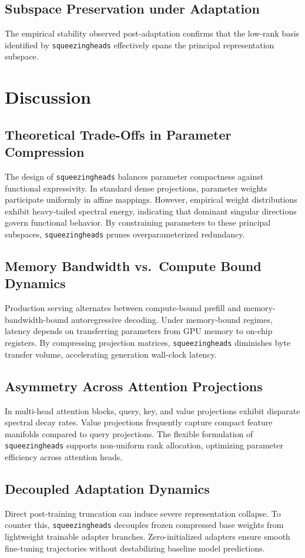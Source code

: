 \subsection{Subspace Preservation under Adaptation}
The empirical stability observed post-adaptation confirms that the low-rank basis identified by \texttt{squeezingheads} effectively spans the principal representation subspace.


\section{Discussion}

\subsection{Theoretical Trade-Offs in Parameter Compression}
The design of \texttt{squeezingheads} balances parameter compactness against functional expressivity. In standard dense projections, parameter weights participate uniformly in affine mappings. However, empirical weight distributions exhibit heavy-tailed spectral energy, indicating that dominant singular directions govern functional behavior. By constraining parameters to these principal subspaces, \texttt{squeezingheads} prunes overparameterized redundancy.

\subsection{Memory Bandwidth vs.\ Compute Bound Dynamics}
Production serving alternates between compute-bound prefill and memory-bandwidth-bound autoregressive decoding. Under memory-bound regimes, latency depends on transferring parameters from GPU memory to on-chip registers. By compressing projection matrices, \texttt{squeezingheads} diminishes byte transfer volume, accelerating generation wall-clock latency.

\subsection{Asymmetry Across Attention Projections}
In multi-head attention blocks, query, key, and value projections exhibit disparate spectral decay rates. Value projections frequently capture compact feature manifolds compared to query projections. The flexible formulation of \texttt{squeezingheads} supports non-uniform rank allocation, optimizing parameter efficiency across attention heads.

\subsection{Decoupled Adaptation Dynamics}
Direct post-training truncation can induce severe representation collapse. To counter this, \texttt{squeezingheads} decouples frozen compressed base weights from lightweight trainable adapter branches. Zero-initialized adapters ensure smooth fine-tuning trajectories without destabilizing baseline model predictions.

